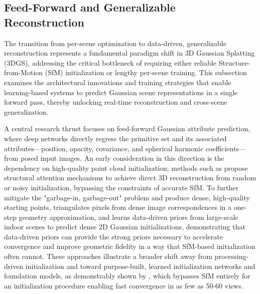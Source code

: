 \documentclass[11pt,a4paper]{article}
\begin{document}
\subsection{Feed-Forward and Generalizable Reconstruction}


The transition from per-scene optimization to data-driven, generalizable reconstruction represents a fundamental paradigm shift in 3D Gaussian Splatting (3DGS), addressing the critical bottleneck of requiring either reliable Structure-from-Motion (SfM) initialization or lengthy per-scene training. This subsection examines the architectural innovations and training strategies that enable learning-based systems to predict Gaussian scene representations in a single forward pass, thereby unlocking real-time reconstruction and cross-scene generalization.

A central research thrust focuses on feed-forward Gaussian attribute prediction, where deep networks directly regress the primitive set and its associated attributes---position, opacity, covariance, and spherical harmonic coefficients---from posed input images. An early consideration in this direction is the dependency on high-quality point cloud initialization; methods such as \cite{arxiv:2506.23611v1} propose structural attention mechanisms to achieve direct 3D reconstruction from random or noisy initialization, bypassing the constraints of accurate SfM. To further mitigate the "garbage-in, garbage-out" problem and produce dense, high-quality starting points, \cite{arxiv:2504.13204v2} triangulates pixels from dense image correspondences in a one-step geometry approximation, and \cite{arxiv:2505.05591v2} learns data-driven priors from large-scale indoor scenes to predict dense 2D Gaussian initializations, demonstrating that data-driven priors can provide the strong priors necessary to accelerate convergence and improve geometric fidelity in a way that SfM-based initialization often cannot. These approaches illustrate a broader shift away from processing-driven initialization and toward purpose-built, learned initialization networks and foundation models, as demonstrably shown by \cite{arxiv:2607.03209v1}, which bypasses SfM entirely for an initialization procedure enabling fast convergence in as few as 50-60 views.
\end{document}

